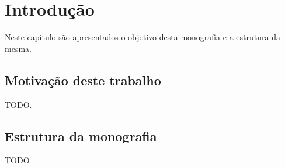 \chapter{Introdução\label{cap:introducao}}

\vfill

Neste capítulo são apresentados o objetivo desta monografia e a estrutura
da mesma.

\newpage

\section{Motivação deste trabalho}

    TODO.


\section{Estrutura da monografia}

    TODO
